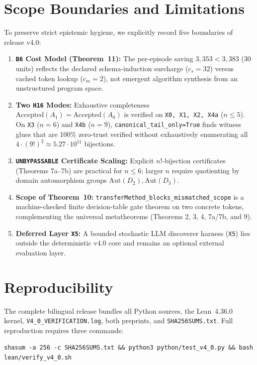 \documentclass[10pt,a4paper]{article}
\newcommand{\code}[1]{\nolinkurl{#1}}
\begin{document}
\section{Scope Boundaries and Limitations}

To preserve strict epistemic hygiene, we explicitly record five boundaries of release v4.0:
\begin{enumerate}
\item \textbf{\code{B6} Cost Model (Theorem~11):} The per-episode saving $3,353 < 3,383$ (30 units) reflects the declared schema-induction surcharge ($c_s = 32$) versus cached token lookup ($c_m = 2$), not emergent algorithm synthesis from an unstructured program space.
\item \textbf{Two \code{H16} Modes:} Exhaustive completeness $\mathrm{Accepted}(A_1) = \mathrm{Accepted}(A_0)$ is verified on \texttt{X0, X1, X2, X4a} ($n \le 5$). On \code{X3} ($n=6$) and \code{X4b} ($n=9$), \code{canonical_tail_only=True} finds witness glues that are 100\% zero-trust verified without exhaustively enumerating all $4\cdot(9!)^2 \approx 5.27\cdot 10^{11}$ bijections.
\item \textbf{\code{UNBYPASSABLE} Certificate Scaling:} Explicit $n!$-bijection certificates (Theorems 7a--7b) are practical for $n \le 6$; larger $n$ require quotienting by domain automorphism groups $\mathrm{Aut}(D_2), \mathrm{Aut}(D_3)$.
\item \textbf{Scope of Theorem~10:} \code{transferMethod_blocks_mismatched_scope} is a machine-checked finite decision-table gate theorem on two concrete tokens, complementing the universal metatheorems (Theorems 2, 3, 4, 7a/7b, and 9).
\item \textbf{Deferred Layer \code{X5}:} A bounded stochastic LLM discoverer harness (\code{X5}) lies outside the deterministic v4.0 core and remains an optional external evaluation layer.
\end{enumerate}

\section{Reproducibility}

The complete bilingual release bundles all Python sources, the Lean~4.36.0 kernel, \code{V4_0_VERIFICATION.log}, both preprints, and \code{SHA256SUMS.txt}. Full reproduction requires three commands:
\begin{center}
\small\texttt{shasum -a 256 -c SHA256SUMS.txt \&\& python3 python/test\_v4\_0.py \&\& bash lean/verify\_v4\_0.sh}
\end{center}
\end{document}
